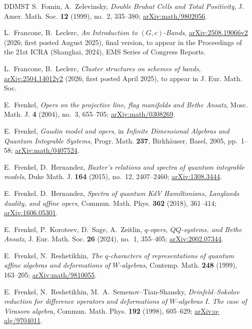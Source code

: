 \documentclass[11pt,leqno]{amsart}
\numberwithin{equation}{section}
\theoremstyle{plain}
\theoremstyle{definition}
\theoremstyle{plain}
\theoremstyle{definition}
\theoremstyle{remark}
\begin{document}
\begin{thebibliography}{DDMST}
S.~Fomin, A.~Zelevinsky,
\emph{Double Bruhat Cells and Total Positivity},
J. Amer. Math. Soc. \textbf{12} (1999), no.~2, 335--380; \href{https://arxiv.org/abs/math/9802056}{arXiv:math/9802056}.

L.~Francone, B.~Leclerc,
\emph{An Introduction to $(G,c)$-Bands},
\href{https://arxiv.org/abs/2508.19066v2}{arXiv:2508.19066v2} (2026; first posted August 2025), final version, to appear in the Proceedings of the 21st ICRA (Shanghai, 2024), EMS Series of Congress Reports.

L.~Francone, B.~Leclerc,
\emph{Cluster structures on schemes of bands},
\href{https://arxiv.org/abs/2504.14012v2}{arXiv:2504.14012v2} (2026; first posted April 2025), to appear in J. Eur. Math. Soc.

E.~Frenkel,
\emph{Opers on the projective line, flag manifolds and Bethe Ansatz},
Mosc. Math. J. \textbf{4} (2004), no.~3, 655--705; \href{https://arxiv.org/abs/math/0308269}{arXiv:math/0308269}.

E.~Frenkel,
\emph{Gaudin model and opers},
in \emph{Infinite Dimensional Algebras and Quantum Integrable Systems},
Progr. Math. \textbf{237}, Birkh\"auser, Basel, 2005, pp.~1--58;
\href{https://arxiv.org/abs/math/0407524}{arXiv:math/0407524}.

E.~Frenkel, D.~Hernandez,
\emph{Baxter's relations and spectra of quantum integrable models},
Duke Math. J. \textbf{164} (2015), no.~12, 2407--2460; \href{https://arxiv.org/abs/1308.3444}{arXiv:1308.3444}.

E.~Frenkel, D.~Hernandez,
\emph{Spectra of quantum KdV Hamiltonians, Langlands duality, and affine opers},
Commun. Math. Phys. \textbf{362} (2018), 361--414; \href{https://arxiv.org/abs/1606.05301}{arXiv:1606.05301}.

E.~Frenkel, P.~Koroteev, D.~Sage, A.~Zeitlin,
\emph{$q$-opers, $QQ$-systems, and Bethe Ansatz},
J. Eur. Math. Soc. \textbf{26} (2024), no.~1, 355--405; \href{https://arxiv.org/abs/2002.07344}{arXiv:2002.07344}.

E.~Frenkel, N.~Reshetikhin,
\emph{The $q$-characters of representations of quantum affine algebras and deformations of $W$-algebras},
Contemp. Math. \textbf{248} (1999), 163--205; \href{https://arxiv.org/abs/math/9810055}{arXiv:math/9810055}.

E.~Frenkel, N.~Reshetikhin, M.~A.~Semenov--Tian-Shansky,
\emph{Drinfeld--Sokolov reduction for difference operators and deformations of $W$-algebras I. The case of Virasoro algebra},
Commun. Math. Phys. \textbf{192} (1998), 605--629; \href{https://arxiv.org/abs/q-alg/9704011}{arXiv:q-alg/9704011}.


\end{thebibliography}
\end{document}
